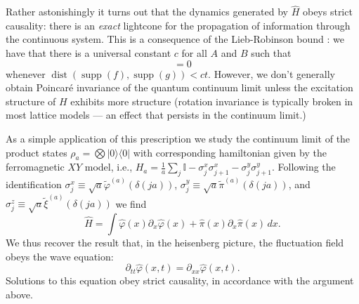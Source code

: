 \documentclass[prl,twocolumn,lengthcheck,superscriptaddress]{revtex4-1}
\newcommand{\supp}{\operatorname{supp}}
\newcommand{\dist}{\operatorname{dist}}
\theoremstyle{definition}
\theoremstyle{remark}
\begin{document}
Rather astonishingly it turns out that the dynamics generated by $\widehat{H}$ obeys strict causality: there is an \emph{exact} lightcone for the propagation of information through the continuous system. This is a consequence of the Lieb-Robinson bound  \cite{lieb:1972a,bratteli:1997a,nachtergaele:2010b}: we have that there is a universal constant $c$ for all $A$ and $B$ such that
\begin{equation}
	[\widehat{\phi}(f), e^{-it\widehat{H}} \widehat{\phi}(g)e^{it\widehat{H}} ] = 0
\end{equation}
whenever $\dist(\supp(f) , \supp(g)) < ct$. However, we don't generally obtain Poincar\'e invariance of the quantum continuum limit unless the excitation structure of $H$ exhibits more structure (rotation invariance is typically broken in most lattice models --- an effect that persists in the continuum limit.) 

As a simple application of this prescription we study the continuum limit of the product states $\rho_a = \bigotimes |0\rangle\langle 0|$ with corresponding hamiltonian given by the ferromagnetic $XY$ model, i.e., $H_a = \frac{1}{a}\sum_{j} \mathbb{I} - \sigma^x_j\sigma_{j+1}^x - \sigma^y_j\sigma_{j+1}^y$. Following the identification $\sigma^x_j \equiv \sqrt{a}\widetilde{\varphi}^{(a)}(\delta(ja))$, $\sigma^y_j \equiv \sqrt{a}\widetilde{\pi}^{(a)}(\delta(ja))$, and $\sigma^z_j \equiv \sqrt{a}\widetilde{\xi}^{(a)}(\delta(ja))$ we find
\begin{equation}
	\widehat{H} = \int \widehat{\varphi}(x) \partial_x\widehat{\varphi}(x) + \widehat{\pi}(x) \partial_x\widehat{\pi}(x) \, dx.
\end{equation}
We thus recover the result that, in the heisenberg picture, the fluctuation field obeys the wave equation:
\begin{equation}
	\partial_{tt}\widehat{\varphi}(x,t) = \partial_{xx}\widehat{\varphi}(x,t).
\end{equation}
Solutions to this equation obey strict causality, in accordance with the argument above.
\end{document}
